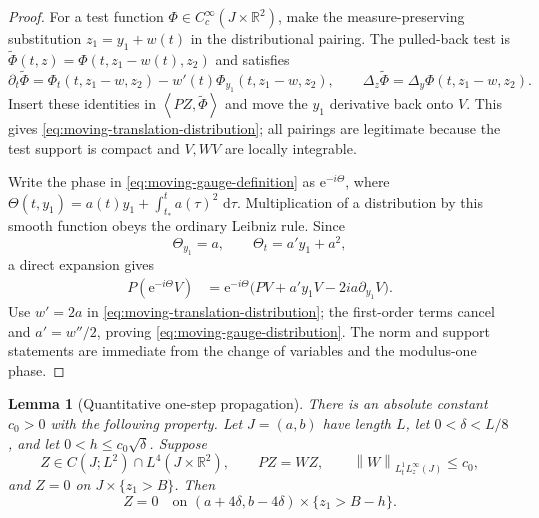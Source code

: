 \documentclass[11pt,oneside]{book}
\newtheorem{lemma}[theorem]{Lemma}
\theoremstyle{definition}
\theoremstyle{remark}
\newcommand{\R}{\mathbb R}
\newcommand{\1}{\mathbf 1}
\newcommand{\dd}{\,\mathrm d}
\newcommand{\norm}[1]{\left\lVert #1\right\rVert}
\newcommand{\pair}[2]{\left\langle #1,#2\right\rangle}
\newcommand{\e}{\mathrm e}
\begin{document}
\begin{proof}
For a test function $\Phi\in C_c^\infty(J\times\R^2)$, make the
measure-preserving substitution $z_1=y_1+w(t)$ in the distributional pairing.
The pulled-back test is
$\widetilde\Phi(t,z)=\Phi(t,z_1-w(t),z_2)$ and satisfies
\[
 \partial_t\widetilde\Phi
 =\Phi_t(t,z_1-w,z_2)-w'(t)\Phi_{y_1}(t,z_1-w,z_2),
 \qquad
 \Delta_z\widetilde\Phi=\Delta_y\Phi(t,z_1-w,z_2).
\]
Insert these identities in $\pair{PZ}{\widetilde\Phi}$ and move the
$y_1$ derivative back onto $V$.  This gives
\eqref{eq:moving-translation-distribution}; all pairings are legitimate
because the test support is compact and $V,WV$ are locally integrable.

Write the phase in \eqref{eq:moving-gauge-definition} as $\e^{-i\Theta}$,
where $\Theta(t,y_1)=a(t)y_1+\int_{t_*}^ta(\tau)^2\,\dd\tau$.
Multiplication of a distribution by this smooth function obeys the ordinary
Leibniz rule.  Since
\[
 \Theta_{y_1}=a,
 \qquad \Theta_t=a'y_1+a^2,
\]
a direct expansion gives
\begin{align*}
 P(\e^{-i\Theta}V)
 &=\e^{-i\Theta}
   \bigl(PV+a'y_1V-2ia\partial_{y_1}V\bigr).
\end{align*}
Use $w'=2a$ in \eqref{eq:moving-translation-distribution}; the first-order
terms cancel and $a'=w''/2$, proving
\eqref{eq:moving-gauge-distribution}.  The norm and support statements are
immediate from the change of variables and the modulus-one phase.
\end{proof}

\begin{lemma}[Quantitative one-step propagation]\label{lem:one-step-propagation}
There is an absolute constant $c_0>0$ with the following property.  Let
$J=(a,b)$ have length $L$, let $0<\delta<L/8$, and let
$0<h\le c_0\sqrt\delta$.  Suppose
\begin{equation}
 Z\in C(J;L^2)\cap L^4(J\times\R^2),
 \qquad PZ=WZ,
 \qquad \norm W_{L^1_tL^\infty_z(J)}\le c_0,        \label{eq:step-hyp}
\end{equation}
and $Z=0$ on $J\times\{z_1>B\}$.  Then
\begin{equation}
 Z=0\quad\text{on }
 (a+4\delta,b-4\delta)\times\{z_1>B-h\}.           \label{eq:step-conclusion}
\end{equation}
\end{lemma}
\end{document}
